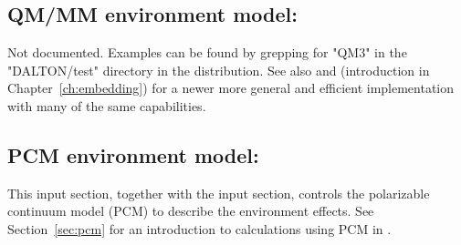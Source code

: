 \subsection{QM/MM environment model: }
\label{sec:qm3}

Not documented. Examples can be found by grepping for "QM3" in the "DALTON/test" directory in the distribution. See also  and  
(introduction in Chapter~\ref{ch:embedding}) for a newer more general and efficient implementation with many of the same capabilities.

\subsection{PCM environment model: }
\label{subsec:pcm}

This input section, together with the  input section,
controls the polarizable continuum model (PCM) to describe the
environment effects. See Section~\ref{sec:pcm} for an introduction to
calculations using PCM in {\dalton}.


